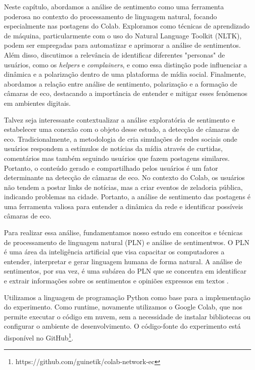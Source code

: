 Neste capítulo, abordamos a análise de sentimento como uma ferramenta poderosa no contexto do processamento de linguagem natural, focando especialmente nas postagens do Colab. Exploramos como técnicas de aprendizado de máquina, particularmente com o uso do Natural Language Toolkit (NLTK), podem ser empregadas para automatizar e aprimorar a análise de sentimentos. Além disso, discutimos a relevância de identificar diferentes "personas" de usuários, como os \textit{helpers} e \textit{complainers}, e como essa distinção pode influenciar a dinâmica e a polarização dentro de uma plataforma de mídia social. Finalmente, abordamos a relação entre análise de sentimento, polarização e a formação de câmaras de eco, destacando a importância de entender e mitigar esses fenômenos em ambientes digitais.

Talvez seja interessante contextualizar a análise exploratória de sentimento e estabelecer uma conexão com o objeto desse estudo, a detecção de câmaras de eco. Tradicionalmente, a metodologia de  cria simulações de redes sociais onde usuários respondem a estímulos de notícias da mídia através de curtidas, comentários mas também seguindo usuários que fazem postagens similares. Portanto, o conteúdo gerado e compartilhado pelos usuários é um fator determinante na detecção de câmaras de eco. No contexto do Colab, os usuários não tendem a postar links de notícias, mas a criar eventos de zeladoria pública, indicando problemas na cidade. Portanto, a análise de sentimento das postagens é uma ferramenta valiosa para entender a dinâmica da rede e identificar possíveis câmaras de eco.

Para realizar essa análise, fundamentamos nosso estudo em conceitos e técnicas de processamento de linguagem natural (PLN) e análise de sentimentwos. O PLN é uma área da inteligência artificial que visa capacitar os computadores a entender, interpretar e gerar linguagem humana de forma natural. A análise de sentimentos, por sua vez, é uma subárea do PLN que se concentra em identificar e extrair informações sobre os sentimentos e opiniões expressos em textos \cite []{2009_Bird_BOOK}.

Utilizamos a linguagem de programação Python como base para a implementação do experimento. Como runtime, novamente utilizamos o Google Colab, que nos permite executar o código em nuvem, sem a necessidade de instalar bibliotecas ou configurar o ambiente de desenvolvimento. O código-fonte do experimento está disponível no GitHub\footnote{https://github.com/guinetik/colab-network-ec}.

